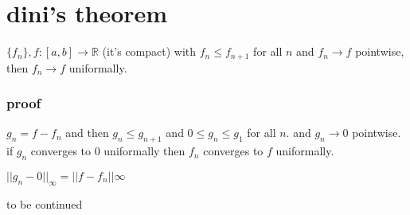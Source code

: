 \documentclass[letterpaper]{article}
\begin{document}
\section*{dini's theorem}
$\{f_n\}, f:[a,b]\to\mathbb{R}$ (it's compact) with $f_n\le f_{n+1}$ for all $n$ and $f_n\to f$ pointwise, then $f_n\to f$ uniformally.
\subsubsection*{proof}
$g_n=f-f_n$ and then $g_n\le g_{n+1}$ and $0\le g_n\le g_1$ for all $n$. and $g_n\to0$ pointwise. if $g_n$ converges to 0 uniformally then $f_n$ converges to $f$ uniformally.

$||g_n-0||_\infty=||f-f_n||\infty$

to be continued
\end{document}
